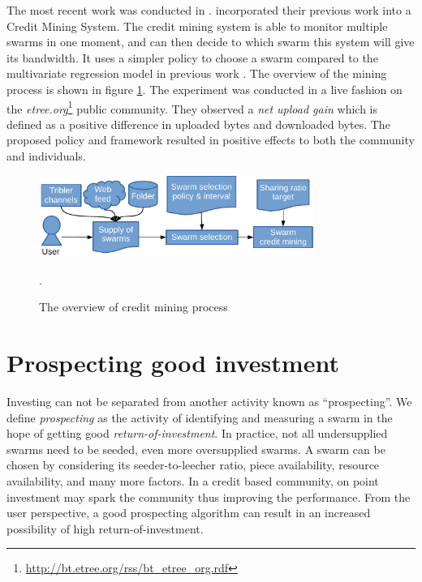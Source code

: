 The most recent work was conducted in \citeyear{2015:creditmining:capota} \cite{2015:creditmining:capota}. \citeauthor{2015:creditmining:capota} incorporated their previous work into a Credit Mining System. The credit mining system is able to monitor multiple swarms in one moment, and can then decide to which swarm this system will give its bandwidth. It uses a simpler policy to choose a swarm compared to the multivariate regression model in previous work \cite{2013:investmentcm:capota}. The overview of the mining process is shown in figure \ref{fig:cm15}. The experiment was conducted in a live fashion on the \textit{etree.org}\footnote{\url{http://bt.etree.org/rss/bt\_etree\_org.rdf}} public community. They observed a \textit{net upload gain} which is defined as a positive difference in uploaded bytes and downloaded bytes. The proposed policy and framework resulted in positive effects to both the community and individuals.

\begin{figure}[ht]
	\centering
	\includegraphics[width=0.8\textwidth]{pics/creditmining2015.pdf}
	\caption{The overview of credit mining process \cite{2015:creditmining:capota}}.
	\label{fig:cm15}
\end{figure}


\section{Prospecting good investment}

Investing can not be separated from another activity known as ``prospecting''. We define \textit{prospecting} as the activity of identifying and measuring a swarm in the hope of getting good \textit{return-of-investment}. In practice, not all undersupplied swarms need to be seeded, even more oversupplied swarms. A swarm can be chosen by considering its seeder-to-leecher ratio, piece availability, resource availability, and many more factors. In a credit based community, on point investment may spark the community thus improving the performance. From the user perspective, a good prospecting algorithm can result in an increased possibility of high return-of-investment.

